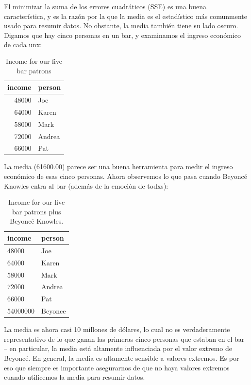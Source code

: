 \documentclass[
  12pt,
]{book}
\begin{document}
El minimizar la suma de los errores cuadráticos (SSE) es una buena característica, y es la razón por la que la media es el estadístico más comunmente usado para resumir datos. No obstante, la media también tiene su lado oscuro. Digamos que hay cinco personas en un bar, y examinamos el ingreso económico de cada unx:

\begin{table}

\caption{\label{tab:unnamed-chunk-14}Income for our five bar patrons}
\centering
\begin{tabular}[t]{r|l}
\hline
income & person\\
\hline
48000 & Joe\\
\hline
64000 & Karen\\
\hline
58000 & Mark\\
\hline
72000 & Andrea\\
\hline
66000 & Pat\\
\hline
\end{tabular}
\end{table}

La media (61600.00) parece ser una buena herramienta para medir el ingreso económico de esas cinco personas. Ahora observemos lo que pasa cuando Beyoncé Knowles entra al bar (además de la emoción de todxs):

\begin{table}

\caption{\label{tab:unnamed-chunk-16}Income for our five bar patrons plus Beyoncé Knowles.}
\centering
\begin{tabular}[t]{l|l}
\hline
income & person\\
\hline
48000 & Joe\\
\hline
64000 & Karen\\
\hline
58000 & Mark\\
\hline
72000 & Andrea\\
\hline
66000 & Pat\\
\hline
54000000 & Beyonce\\
\hline
\end{tabular}
\end{table}

La media es ahora casi 10 millones de dólares, lo cual no es verdaderamente representativo de lo que ganan las primeras cinco personas que estaban en el bar -- en particular, la media está altamente influenciada por el valor extremo de Beyoncé. En general, la media es altamente sensible a valores extremos. Es por eso que siempre es importante asegurarnos de que no haya valores extremos cuando utilicemos la media para resumir datos.
\end{document}
